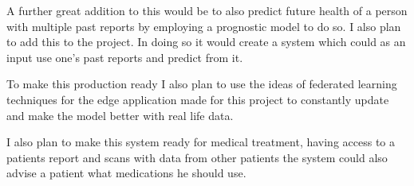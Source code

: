 \documentclass[a4paper]{article}
\begin{document}
\qquad A further great addition to this would be to also predict future health of a person with multiple past reports by employing a prognostic model to do so. I also plan to add this to the project. In doing so it would create a system which could as an input use one's past reports and predict from it.

\qquad To make this production ready I also plan to use the ideas of federated learning techniques for the edge application made for this project to constantly update and make the model better with real life data.

\qquad I also plan to make this system ready for medical treatment, having access to a patients report and scans with data from other patients the system could also advise a patient what medications he should use.

\printbibliography
\end{document}
